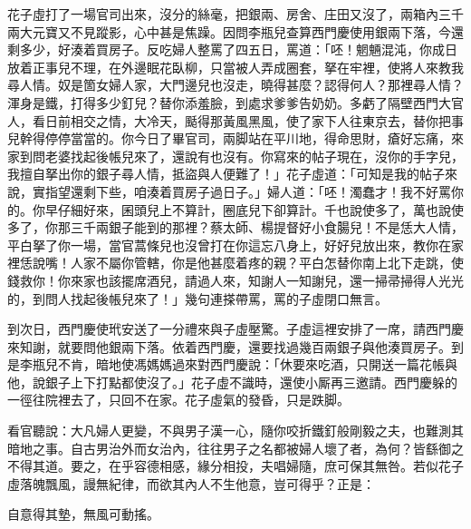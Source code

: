 花子虛打了一場官司出來，沒分的絲毫，把銀兩、房舍、庄田又沒了，兩箱內三千兩大元寶又不見蹤影，心中甚是焦躁。因問李瓶兒查算西門慶使用銀兩下落，今還剩多少，好湊着買房子。反吃婦人整罵了四五日，罵道：「呸！魍魎混沌，{}你成日放着正事兒不理，在外邊眠花臥柳，只當被人弄成圈套，拏在牢裡，使將人來教我尋人情。奴是箇女婦人家，大門邊兒也沒走，曉得甚麼？認得何人？那裡尋人情？渾身是鐵，打得多少釘兒？替你添羞臉，到處求爹爹告奶奶。多虧了隔壁西門大官人，{}看日前相交之情，大冷天，颳得那黃風黑風，使了家下人往東京去，替你把事兒幹得停停當當的。你今日了畢官司，兩脚站在平川地，得命思財，瘡好忘痛，來家到問老婆找起後帳兒來了，還說有也沒有。你寫來的帖子現在，沒你的手字兒，我擅自拏出你的銀子尋人情，抵盜與人便難了！」{}{}花子虛道：「可知是我的帖子來說，{}實指望還剩下些，咱湊着買房子過日子。」婦人道：「呸！濁蠢才！我不好罵你的。你早仔細好來，囷頭兒上不算計，圈底兒下卻算計。千也說使多了，萬也說使多了，你那三千兩銀子能到的那裡？蔡太師、楊提督好小食腸兒！不是恁大人情，平白拏了你一場，當官蒿條兒也沒曾打在你這忘八身上，好好兒放出來，教你在家裡恁說嘴！人家不屬你管轄，你是他甚麼着疼的親？平白怎替你南上北下走跳，使錢救你！你來家也該擺席酒兒，請過人來，知謝人一知謝兒，還一掃帚掃得人光光的，到問人找起後帳兒來了！」幾句連搽帶罵，罵的子虛閉口無言。

到次日，西門慶使玳安送了一分禮來與子虛壓驚。子虛這裡安排了一席，請西門慶來知謝，就要問他銀兩下落。依着西門慶，還要找過幾百兩銀子與他湊買房子。到是李瓶兒不肯，{}暗地使馮媽媽過來對西門慶說：「休要來吃酒，只開送一篇花帳與他，說銀子上下打點都使沒了。」花子虛不識時，還使小厮再三邀請。西門慶躲的一徑往院裡去了，只回不在家。花子虛氣的發昏，只是跌脚。

看官聽說：大凡婦人更變，不與男子漢一心，隨你咬折鐵釘般剛毅之夫，也難測其暗地之事。自古男治外而女治內，往往男子之名都被婦人壞了者，為何？皆繇御之不得其道。要之，在乎容德相感，緣分相投，夫唱婦隨，庶可保其無咎。若似花子虛落魄飄風，謾無紀律，而欲其內人不生他意，豈可得乎？正是：

\begin{myquote}
自意得其墊，無風可動搖。
\end{myquote}

